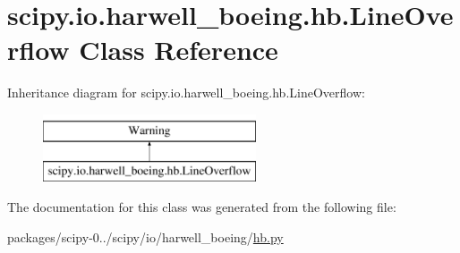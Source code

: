 \hypertarget{classscipy_1_1io_1_1harwell__boeing_1_1hb_1_1LineOverflow}{}\section{scipy.\+io.\+harwell\+\_\+boeing.\+hb.\+Line\+Overflow Class Reference}
\label{classscipy_1_1io_1_1harwell__boeing_1_1hb_1_1LineOverflow}
Inheritance diagram for scipy.\+io.\+harwell\+\_\+boeing.\+hb.\+Line\+Overflow\+:\begin{figure}[H]
\begin{center}
\leavevmode
\includegraphics[height=2.000000cm]{classscipy_1_1io_1_1harwell__boeing_1_1hb_1_1LineOverflow}
\end{center}
\end{figure}


The documentation for this class was generated from the following file\+:\begin{DoxyCompactItemize}
\item 
packages/scipy-\/0../scipy/io/harwell\+\_\+boeing/\hyperlink{hb_8py}{hb.\+py}\end{DoxyCompactItemize}
